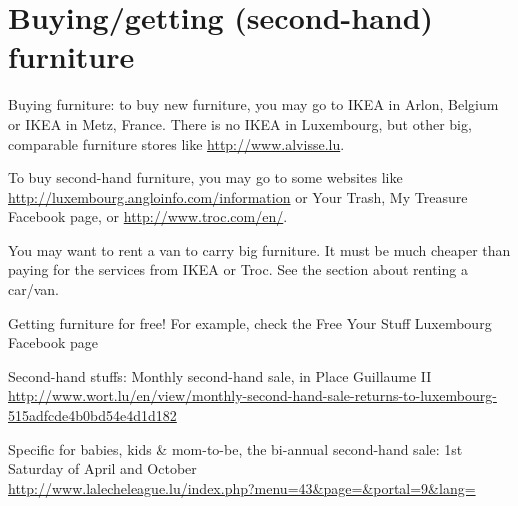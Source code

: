 \section{Buying/getting (second-hand) furniture}
Buying furniture: to buy new furniture, you may go to IKEA in Arlon, Belgium or IKEA in Metz, France.
There is no IKEA in Luxembourg, but other big, comparable furniture stores like \url{http://www.alvisse.lu}. 

To buy second-hand furniture, you may go to some websites like \url{http://luxembourg.angloinfo.com/information}
or Your Trash, My Treasure Facebook page, or \url{http://www.troc.com/en/}. 

You may want to rent a van to carry big furniture. 
It must be much cheaper than paying for the services from IKEA or Troc. 
See the section about renting a car/van.  

Getting furniture for free! For example, check the Free Your Stuff Luxembourg Facebook page

Second-hand stuffs: Monthly second-hand sale, in Place Guillaume II \\ 
\url{http://www.wort.lu/en/view/monthly-second-hand-sale-returns-to-luxembourg-515adfcde4b0bd54e4d1d182}

Specific for babies, kids \& mom-to-be, the bi-annual second-hand sale: 1st Saturday of April and October \\ 
\url{http://www.lalecheleague.lu/index.php?menu=43\&page=\&portal=9\&lang=}

